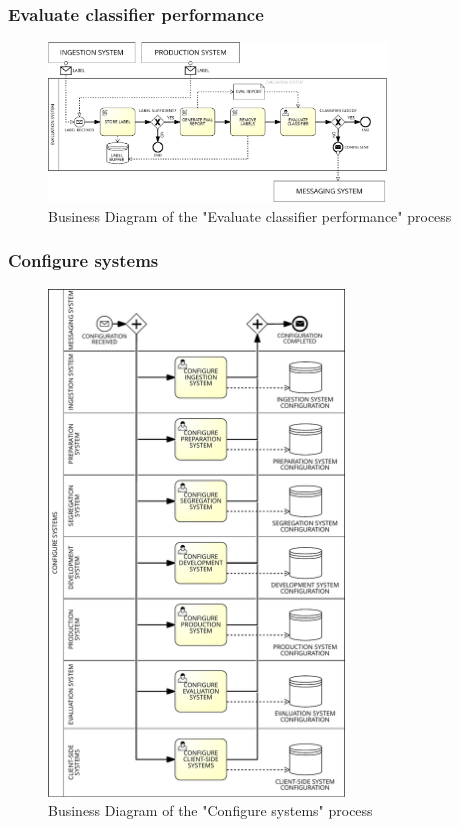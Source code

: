 \subsubsection{Evaluate classifier performance}
\label{sec:bpmn_evaluate_classifier_performance}

\begin{figure}[H]
\centering
\includegraphics[width=0.8\textwidth]{figures/Business Diagram - Evaluate Classifier Performance.pdf}
\caption{Business Diagram of the "Evaluate classifier performance" process}
\label{fig:bpmn_evaluate_classifier_performance}
\end{figure}

\subsubsection{Configure systems}
\label{sec:bpmn_configure_systems}

\begin{figure}[H]
\centering
\includegraphics[width=0.7\textwidth]{figures/Business Diagram - Configure Systems.pdf}
\caption{Business Diagram of the "Configure systems" process}
\label{fig:bpmn_configure_systems}
\end{figure}